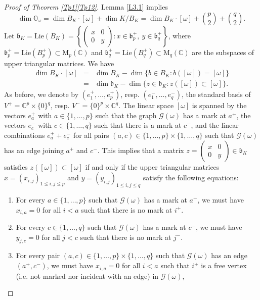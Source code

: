 \documentclass[ALCO,Unicode]{cedram}
\newcommand{\fb}{\mathfrak{b}}
\newcommand{\Mat}{\mathrm{M}}
\newcommand{\Xorbit}{\mathbb{O}}
\newcommand{\Lie}{\mathrm{Lie}}
\newcommand{\mC}{\mathbb{C}}
\begin{document}
\begin{proof}[Proof of Theorem \ref{Tp1}\ref{Tp12}]
Lemma \ref{L3.1} implies
\begin{equation}
\label{dim-1}
\dim\Xorbit_\omega=\dim B_K\cdot[\omega]+\dim K/B_K=\dim B_K\cdot[\omega]+\binom{p}{2}+\binom{q}{2}.
\end{equation}
Let $\fb_K=\Lie(B_K)=\left\{\begin{pmatrix} x & 0\\ 0 & y \end{pmatrix}:x\in\fb_p^+,\ y\in\fb_q^+\right\}$, where $\fb_p^+=\Lie(B_p^+)\subset\Mat_p(\mC)$ and $\fb_q^+=\Lie(B_q^+)\subset\Mat_q(\mC)$ are the subspaces of upper triangular matrices.
We have
\begin{eqnarray}
\dim B_K\cdot[\omega] & = & \dim B_K-\dim\{b\in B_K:b([\omega])=[\omega]\}  \label{dim-2}\\
 & = & \dim\fb_K-\dim\{z\in\fb_K:z([\omega])\subset[\omega]\}. \nonumber
\end{eqnarray}
As before, we denote by $(e_1^+,\ldots,e_p^+)$, resp. $(e_1^-,\ldots,e_q^-)$, the standard basis of $V^+=\mC^p\times\{0\}^q$, resp. $V^-=\{0\}^p\times\mC^q$.
The linear space $[\omega]$ is spanned by the vectors $e_a^+$ with $a\in\{1,\ldots,p\}$ such that the graph $\mathcal{G}(\omega)$ has a mark at $a^+$, the vectors $e_c^-$ with $c\in\{1,\ldots,q\}$ such that there is a mark at $c^-$, and the linear combinations $e_a^++e_c^-$ for all pairs $(a,c)\in\{1,\ldots,p\}\times\{1,\ldots,q\}$ such that $\mathcal{G}(\omega)$ has an edge joining $a^+$ and $c^-$.
This implies that a matrix $z=\begin{pmatrix} x & 0\\ 0 & y \end{pmatrix}\in\fb_K$
satisfies $z([\omega])\subset [\omega]$ if and only if the upper triangular matrices $x=(x_{i,j})_{1\leq i,j\leq p}$ and $y=(y_{i,j})_{1\leq i,j\leq q}$ satisfy the following equations:
\begin{enumerate}
\item For every $a\in\{1,\ldots,p\}$ such that $\mathcal{G}(\omega)$ has a mark at $a^+$, we must have $x_{i,a}=0$ for all $i<a$ such that there is no mark at $i^+$.
\item For every $c\in\{1,\ldots,q\}$ such that $\mathcal{G}(\omega)$ has a mark at $c^-$, we must have $y_{j,c}=0$ for all $j<c$ such that there is no mark at $j^-$.
\item For every pair $(a,c)\in\{1,\ldots,p\}\times\{1,\ldots,q\}$ such that $\mathcal{G}(\omega)$ has an edge $(a^+,c^-)$, we must have $x_{i,a}=0$ for all $i<a$ such that $i^+$ is a free vertex (i.e. not marked nor incident with an edge) in $\mathcal{G}(\omega)$,

\end{enumerate}
\end{proof}
\end{document}
